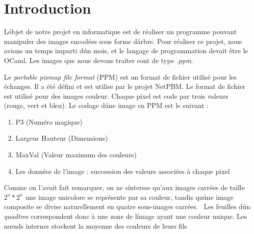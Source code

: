 \documentclass[12pt]{article}
\begin{document}

\section*{Introduction}
L\'objet de notre projet en informatique est de réaliser un programme pouvant manipuler des images encodées sous forme d\'arbre. Pour réaliser ce projet, nous avions un temps imparti d\'un mois, et le langage de programmation devait être le OCaml. Les images que nous devons traiter sont de type \textit{.ppm}. \par
Le \textit{portable pixmap file format} (PPM) est un format de fichier utilisé pour les  échanges. Il a été défini et est utilise par le projet NetPBM. Le format
de fichier est utilisé pour des images couleur. Chaque pixel est code par trois valeurs (rouge, vert et bleu). Le codage d\'une image en PPM est le suivant :
\begin{enumerate}
\item P3 (Numéro magique)
\item Largeur Hauteur (Dimensions)
\item MaxVal (Valeur maximum des couleurs)
\item Les données de l'image : succession des valeurs associées à chaque pixel
\end{enumerate}\par
Comme on l'avait fait remarquer, on ne s\'intersse qu'aux images carrées de taille $2^{n}*2^{n}$ une image unicolore se représente par sa couleur, tandis qu\'une image composite se divise naturellement en quatre sous-images carrées. \
Les feuilles d\'un \textit{quadtree} correspondent donc à une zone de l\'image ayant une couleur unique. Les nœuds internes stockent la moyenne des couleurs de leurs fils
\end{document}
